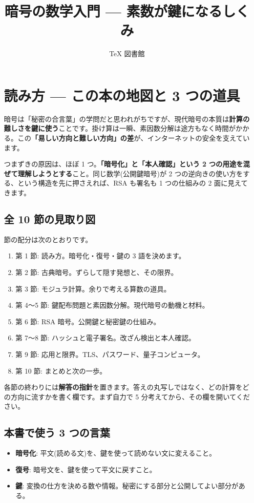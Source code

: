 \documentclass{article}
\title{暗号の数学入門 — 素数が鍵になるしくみ}
\author{TeX 図書館}
\begin{document}
\section{読み方 — この本の地図と 3 つの道具}

暗号は「秘密の合言葉」の学問だと思われがちですが、現代暗号の本質は\textbf{計算の難しさを鍵に使う}ことです。掛け算は一瞬、素因数分解は途方もなく時間がかかる。この\textbf{「易しい方向と難しい方向」の差}が、インターネットの安全を支えています。

つまずきの原因は、ほぼ 1 つ。\textbf{「暗号化」と「本人確認」という 2 つの用途を混ぜて理解しようとする}こと。同じ数学(公開鍵暗号)が 2 つの逆向きの使い方をする、という構造を先に押さえれば、RSA も署名も 1 つの仕組みの 2 面に見えてきます。

\subsection{全 10 節の見取り図}

節の配分は次のとおりです。

\begin{enumerate}
\item 第 1 節: 読み方。暗号化・復号・鍵の 3 語を決めます。
\item 第 2 節: 古典暗号。ずらして隠す発想と、その限界。
\item 第 3 節: モジュラ計算。余りで考える算数の道具。
\item 第 4〜5 節: 鍵配布問題と素因数分解。現代暗号の動機と材料。
\item 第 6 節: RSA 暗号。公開鍵と秘密鍵の仕組み。
\item 第 7〜8 節: ハッシュと電子署名。改ざん検出と本人確認。
\item 第 9 節: 応用と限界。TLS、パスワード、量子コンピュータ。
\item 第 10 節: まとめと次の一歩。
\end{enumerate}

各節の終わりには\textbf{解答の指針}を置きます。答えの丸写しではなく、どの計算をどの方向に流すかを書く欄です。まず自力で 5 分考えてから、その欄を開いてください。

\subsection{本書で使う 3 つの言葉}

\begin{itemize}
\item \textbf{暗号化}: 平文(読める文)を、鍵を使って読めない文に変えること。
\item \textbf{復号}: 暗号文を、鍵を使って平文に戻すこと。
\item \textbf{鍵}: 変換の仕方を決める数や情報。秘密にする部分と公開してよい部分がある。
\end{itemize}
\end{document}
